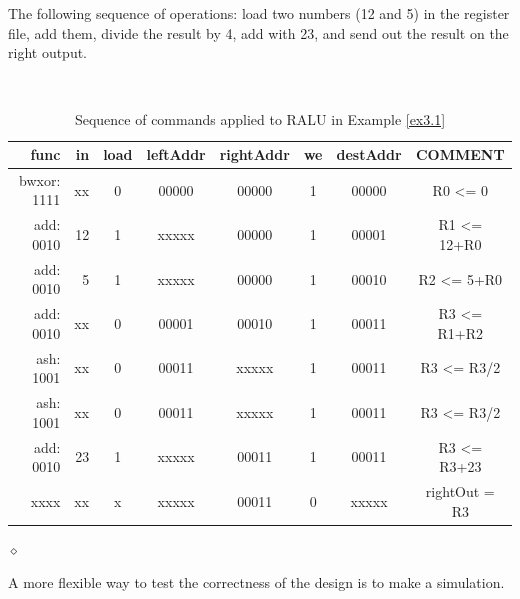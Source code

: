 \begin{exemplu}\label{ex3.1}
The following sequence of operations: load two numbers (12 and 5) in the register file, add them, divide the result by 4, add with 23, and send out the result on the right output.


\begin{table}[H]
  \begin{center}
    \caption{Sequence of commands applied to RALU in Example \ref{ex3.1}}
    \label{raluSeq}
    \vspace{2mm}
    {\tt
    \begin{tabular}{|r|r|c|c|c|c|c||c|}
    \hline
    func &  in & load & leftAddr & rightAddr & we & destAddr & COMMENT          \\ \hline \hline
    bwxor: 1111 &  xx &  0   &  00000   &  00000    & 1  &  00000   & R0 <= 0          \\ \hline
    add: 0010 &  12 &  1   &  xxxxx   &  00000    & 1  &  00001   & R1 <= 12+R0      \\ \hline
    add: 0010 &   5 &  1   &  xxxxx   &  00000    & 1  &  00010   & R2 <= 5+R0       \\ \hline
    add: 0010 &  xx &  0   &  00001   &  00010    & 1  &  00011   & R3 <= R1+R2      \\ \hline
    ash: 1001 &  xx &  0   &  00011   &  xxxxx    & 1  &  00011   & R3 <= R3/2       \\ \hline
    ash: 1001 &  xx &  0   &  00011   &  xxxxx    & 1  &  00011   & R3 <= R3/2       \\ \hline
    add: 0010 &  23 &  1   &  xxxxx   &  00011    & 1  &  00011   & R3 <= R3+23      \\ \hline
    xxxx &  xx &  x   &  xxxxx   &  00011    & 0  &  xxxxx   & rightOut = R3    \\ \hline
 \end{tabular}
 }
  \end{center}
\end{table}

$\diamond$
\end{exemplu}


A more flexible way to test the correctness of the design is to make a simulation.



